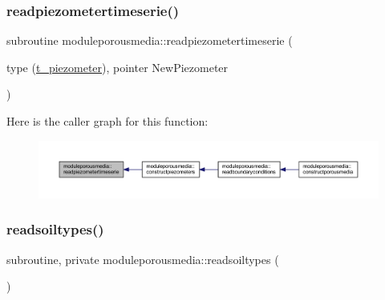 \subsubsection{\texorpdfstring{readpiezometertimeserie()}{readpiezometertimeserie()}}
{\footnotesize\ttfamily subroutine moduleporousmedia\+::readpiezometertimeserie (\begin{DoxyParamCaption}\item[{type (\mbox{\hyperlink{structmoduleporousmedia_1_1t__piezometer}{t\+\_\+piezometer}}), pointer}]{New\+Piezometer }\end{DoxyParamCaption})\hspace{0.3cm}{\ttfamily [private]}}

Here is the caller graph for this function\+:\nopagebreak
\begin{figure}[H]
\begin{center}
\leavevmode
\includegraphics[width=350pt]{namespacemoduleporousmedia_ab8846ea02c912ad7abc75b7736e11552_icgraph}
\end{center}
\end{figure}
\mbox{\label{namespacemoduleporousmedia_a7aef95520258c11f2ce4493e2bef61c8}} 
\subsubsection{\texorpdfstring{readsoiltypes()}{readsoiltypes()}}
{\footnotesize\ttfamily subroutine, private moduleporousmedia\+::readsoiltypes (\begin{DoxyParamCaption}{ }\end{DoxyParamCaption})\hspace{0.3cm}{\ttfamily [private]}}

